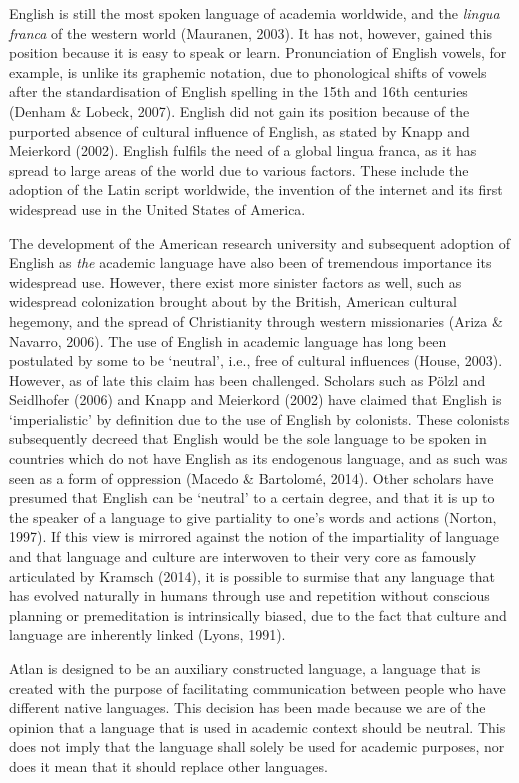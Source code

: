 English is still the most spoken language of academia worldwide, and the \textit{lingua franca} of the western world (Mauranen, 2003). It has not, however, gained this position because it is easy to speak or learn. Pronunciation of English vowels, for example, is unlike its graphemic notation, due to phonological shifts of vowels after the standardisation of English spelling in the 15th and 16th centuries (Denham \& Lobeck, 2007). English did not gain its position because of the purported absence of cultural influence of English, as stated by Knapp and Meierkord (2002). English fulfils the need of a global lingua franca, as it has spread to large areas of the world due to various factors. These include the adoption of the Latin script worldwide, the invention of the internet and its first widespread use in the United States of America. 

The development of the American research university and subsequent adoption of English as \textit{the} academic language have also been of tremendous importance its widespread use. However, there exist more sinister factors as well, such as widespread colonization brought about by the British, American cultural hegemony, and the spread of Christianity through western missionaries (Ariza \& Navarro, 2006). The use of English in academic language has long been postulated by some to be ‘neutral’, i.e., free of cultural influences (House, 2003). However, as of late this claim has been challenged. Scholars such as Pölzl and Seidlhofer (2006) and Knapp and Meierkord (2002) have claimed that English is ‘imperialistic’ by definition due to the use of English by colonists. These colonists subsequently decreed that English would be the sole language to be spoken in countries which do not have English as its endogenous language, and as such was seen as a form of oppression (Macedo \& Bartolomé, 2014). Other scholars have presumed that English can be ‘neutral’ to a certain degree, and that it is up to the speaker of a language to give partiality to one’s words and actions (Norton, 1997). If this view is mirrored against the notion of the impartiality of language and that language and culture are interwoven to their very core as famously articulated by Kramsch (2014), it is possible to surmise that any language that has evolved naturally in humans through use and repetition without conscious planning or premeditation is intrinsically biased, due to the fact that culture and language are inherently linked (Lyons, 1991). 

Atlan is designed to be an auxiliary constructed language, a language that is created with the purpose of facilitating communication between people who have different native languages. This decision has been made because we are of the opinion that a language that is used in academic context should be neutral. This does not imply that the language shall solely be used for academic purposes, nor does it mean that it should replace other languages. 

